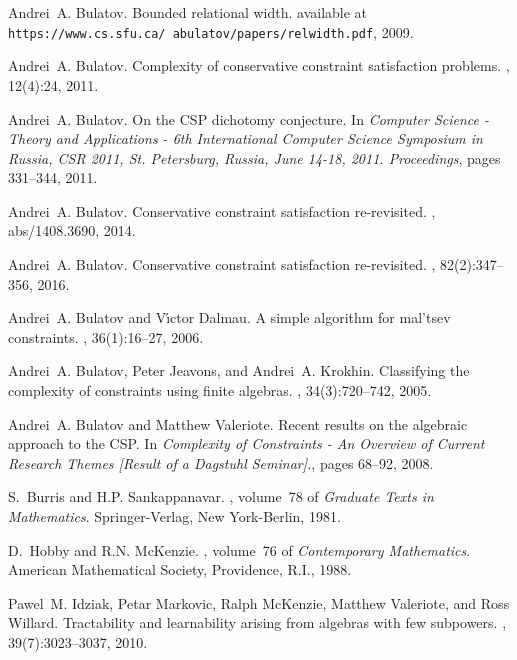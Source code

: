 \documentclass[11pt]{article}
\begin{document}
\begin{thebibliography}{10}
Andrei~A. Bulatov.
\newblock Bounded relational width.
\newblock available at {\tt
  https://www.cs.sfu.ca/~abulatov/papers/relwidth.pdf}, 2009.

Andrei~A. Bulatov.
\newblock Complexity of conservative constraint satisfaction problems.
, 12(4):24, 2011.

Andrei~A. Bulatov.
\newblock On the {CSP} dichotomy conjecture.
\newblock In {\em Computer Science - Theory and Applications - 6th
  International Computer Science Symposium in Russia, {CSR} 2011, St.
  Petersburg, Russia, June 14-18, 2011. Proceedings}, pages 331--344, 2011.

Andrei~A. Bulatov.
\newblock Conservative constraint satisfaction re-revisited.
, abs/1408.3690, 2014.

Andrei~A. Bulatov.
\newblock Conservative constraint satisfaction re-revisited.
, 82(2):347--356, 2016.

Andrei~A. Bulatov and V{\'{\i}}ctor Dalmau.
\newblock A simple algorithm for mal'tsev constraints.
, 36(1):16--27, 2006.

Andrei~A. Bulatov, Peter Jeavons, and Andrei~A. Krokhin.
\newblock Classifying the complexity of constraints using finite algebras.
, 34(3):720--742, 2005.

Andrei~A. Bulatov and Matthew Valeriote.
\newblock Recent results on the algebraic approach to the {CSP}.
\newblock In {\em Complexity of Constraints - An Overview of Current Research
  Themes [Result of a Dagstuhl Seminar].}, pages 68--92, 2008.

S.~Burris and H.P. Sankappanavar.
, volume~78 of {\em Graduate Texts
  in Mathematics}.
\newblock Springer-Verlag, New York-Berlin, 1981.

D.~Hobby and R.N. McKenzie.
, volume~76 of {\em
  Contemporary Mathematics}.
\newblock American Mathematical Society, Providence, R.I., 1988.

Pawel~M. Idziak, Petar Markovic, Ralph McKenzie, Matthew Valeriote, and Ross
  Willard.
\newblock Tractability and learnability arising from algebras with few
  subpowers.
, 39(7):3023--3037, 2010.


\end{thebibliography}
\end{document}
